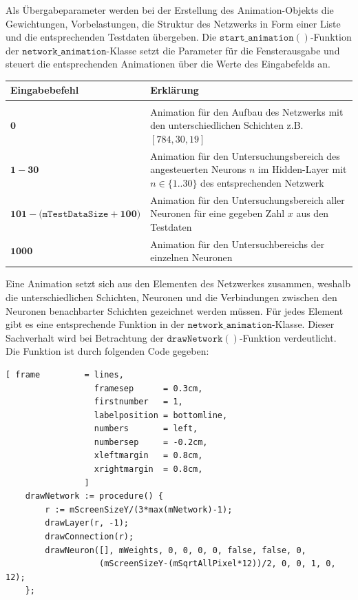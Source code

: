 Als Übergabeparameter werden bei der Erstellung des Animation-Objekts die Gewichtungen, Vorbelastungen, die Struktur des Netzwerks in Form einer Liste und die entsprechenden Testdaten übergeben. Die $\mathtt{start\_animation}()$-Funktion der $\mathtt{network\_animation}$-Klasse setzt die Parameter für die Fensterausgabe und steuert die entsprechenden Animationen über die Werte des Eingabefelds an. \\
\begin{center}
\begin{tabular}{lp{8cm}}
\textbf{Eingabebefehl}   & \textbf{Erklärung} \\
\hline \\
$\mathbf{0}$      & Animation für den Aufbau des Netzwerks mit den unterschiedlichen Schichten z.B. $[784,30,19]$  \\[0.2cm]
$\mathbf{1-30}$   & Animation für den Untersuchungsbereich des angesteuerten Neurons $n$ im Hidden-Layer mit $n \in \{1..30\}$ des entsprechenden Netzwerk  \\[0.2cm]
$\mathbf{101-(\mathtt{mTestDataSize}+100})$  & Animation für den Untersuchungsbereich aller Neuronen für eine gegeben Zahl $x$ aus den Testdaten  \\[0.2cm]
$\mathbf{1000}$   & Animation für den Untersuchbereichs der einzelnen Neuronen  \\
\end{tabular}
\end{center}
Eine Animation setzt sich aus den Elementen des Netzwerkes zusammen, weshalb die unterschiedlichen Schichten, Neuronen und die Verbindungen zwischen den Neuronen benachbarter Schichten gezeichnet werden müssen. Für jedes Element gibt es eine entsprechende Funktion in der $\mathtt{network\_animation}$-Klasse. Dieser Sachverhalt wird bei Betrachtung der $\mathtt{drawNetwork}()$-Funktion verdeutlicht. Die Funktion ist durch folgenden Code gegeben:
\begin{Verbatim}[ frame         = lines, 
                  framesep      = 0.3cm, 
                  firstnumber   = 1,
                  labelposition = bottomline,
                  numbers       = left,
                  numbersep     = -0.2cm,
                  xleftmargin   = 0.8cm,
                  xrightmargin  = 0.8cm,
                ]
    drawNetwork := procedure() {	
        r := mScreenSizeY/(3*max(mNetwork)-1);
        drawLayer(r, -1);	    	
        drawConnection(r);	 
        drawNeuron([], mWeights, 0, 0, 0, 0, false, false, 0,
                   (mScreenSizeY-(mSqrtAllPixel*12))/2, 0, 0, 1, 0, 12);
    };
\end{Verbatim}
